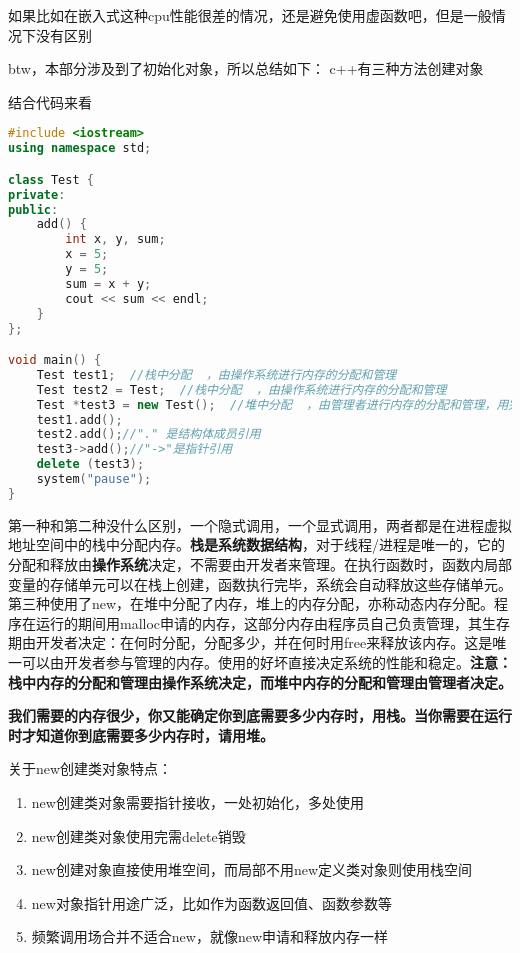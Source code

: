 如果比如在嵌入式这种cpu性能很差的情况，还是避免使用虚函数吧，但是一般情况下没有区别


btw，本部分涉及到了初始化对象，所以总结如下：
c++有三种方法创建对象

结合代码来看


\begin{lstlisting}[language=c++]
#include <iostream>
using namespace std;

class Test {
private:
public:
    add() {
        int x, y, sum;
        x = 5;
        y = 5;
        sum = x + y;
        cout << sum << endl;
    }
};

void main() {
    Test test1;  //栈中分配  ，由操作系统进行内存的分配和管理
    Test test2 = Test;  //栈中分配  ，由操作系统进行内存的分配和管理
    Test *test3 = new Test();  //堆中分配  ，由管理者进行内存的分配和管理，用完必须delete()，否则可能造成内存泄漏
    test1.add();
    test2.add();//"." 是结构体成员引用
    test3->add();//"->"是指针引用
    delete (test3);
    system("pause");
}
\end{lstlisting}

第一种和第二种没什么区别，一个隐式调用，一个显式调用，两者都是在进程虚拟地址空间中的栈中分配内存。\textbf{栈是系统数据结构}，对于线程/进程是唯一的，它的分配和释放由\textbf{操作系统}决定，不需要由开发者来管理。在执行函数时，函数内局部变量的存储单元可以在栈上创建，函数执行完毕，系统会自动释放这些存储单元。第三种使用了new，在堆中分配了内存，堆上的内存分配，亦称动态内存分配。程序在运行的期间用malloc申请的内存，这部分内存由程序员自己负责管理，其生存期由开发者决定：在何时分配，分配多少，并在何时用free来释放该内存。这是唯一可以由开发者参与管理的内存。使用的好坏直接决定系统的性能和稳定。\textbf{注意：栈中内存的分配和管理由操作系统决定，而堆中内存的分配和管理由管理者决定。}

\textbf{我们需要的内存很少，你又能确定你到底需要多少内存时，用栈。当你需要在运行时才知道你到底需要多少内存时，请用堆。}



关于new创建类对象特点：
\begin{enumerate} 
    \item new创建类对象需要指针接收，一处初始化，多处使用
    \item new创建类对象使用完需delete销毁
    \item new创建对象直接使用堆空间，而局部不用new定义类对象则使用栈空间
    \item new对象指针用途广泛，比如作为函数返回值、函数参数等
    \item 频繁调用场合并不适合new，就像new申请和释放内存一样
\end{enumerate}


